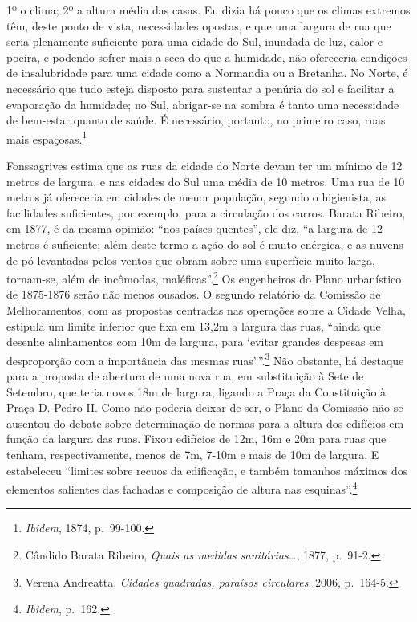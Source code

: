 1º o clima; 2º a altura média das casas. Eu dizia há pouco que os climas
extremos têm, deste ponto de vista, necessidades opostas, e que uma
largura de rua que seria plenamente suficiente para uma cidade do Sul,
inundada de luz, calor e poeira, e podendo sofrer mais a seca do que a
humidade, não ofereceria condições de insalubridade para uma cidade como
a Normandia ou a Bretanha. No Norte, é necessário que tudo esteja
disposto para sustentar a penúria do sol e facilitar a evaporação da
humidade; no Sul, abrigar-se na sombra é tanto uma necessidade de
bem-estar quanto de saúde. É necessário, portanto, no primeiro caso,
ruas mais espaçosas.\footnote{\emph{Ibidem}, 1874, p.~99-100.}

Fonssagrives estima que as ruas da cidade do Norte devam ter um mínimo
de 12 metros de largura, e nas cidades do Sul uma média de 10 metros.
Uma rua de 10 metros já ofereceria em cidades de menor população,
segundo o higienista, as facilidades suficientes, por exemplo, para a
circulação dos carros. Barata Ribeiro, em 1877, é da mesma opinião:
``nos países quentes'', ele diz, ``a largura de 12 metros é suficiente;
além deste termo a ação do sol é muito enérgica, e as nuvens de pó
levantadas pelos ventos que obram sobre uma superfície muito larga,
tornam-se, além de incômodas, maléficas''.\footnote{Cândido Barata
  Ribeiro, \emph{Quais as medidas sanitárias\ldots{}}, 1877, p.~91-2.}
Os engenheiros do Plano urbanístico de 1875-1876 serão não menos
ousados. O segundo relatório da Comissão de Melhoramentos, com as
propostas centradas nas operações sobre a Cidade Velha, estipula um
limite inferior que fixa em 13,2m a largura das ruas, ``ainda que
desenhe alinhamentos com 10m de largura, para `evitar grandes despesas
em desproporção com a importância das mesmas ruas'\,''.\footnote{Verena
  Andreatta, \emph{Cidades quadradas, paraísos circulares}, 2006,
  p.~164-5.} Não obstante, há destaque para a proposta de abertura de
uma nova rua, em substituição à Sete de Setembro, que teria novos 18m de
largura, ligando a Praça da Constituição à Praça D. Pedro II. Como não
poderia deixar de ser, o Plano da Comissão não se ausentou do debate
sobre determinação de normas para a altura dos edifícios em função da
largura das ruas. Fixou edifícios de 12m, 16m e 20m para ruas que
tenham, respectivamente, menos de 7m, 7-10m e mais de 10m de largura. E
estabeleceu ``limites sobre recuos da edificação, e também tamanhos
máximos dos elementos salientes das fachadas e composição de altura nas
esquinas''.\footnote{\emph{Ibidem}, p.~162.}

